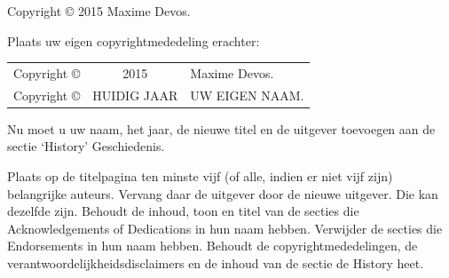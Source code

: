 \documentclass[11pt,a5paper,twoside]{book}
\begin{document}
   Copyright © 2015 Maxime Devos.


  Plaats uw eigen copyrightmededeling erachter:

  \begin{longtabu}{c c l}
   Copyright ©&2015       &Maxime Devos.\\
   Copyright ©&HUIDIG JAAR&UW EIGEN NAAM.
  \end{longtabu}

  Nu moet u uw naam, het jaar, de nieuwe titel en de uitgever toevoegen
   aan de sectie ‘History’ Geschiedenis.

  Plaats op de titelpagina ten minste vijf (of alle, indien er niet vijf zijn)
   belangrijke auteurs. Vervang daar de uitgever door de nieuwe uitgever.
  Die kan dezelfde zijn.
  Behoudt de inhoud, toon en titel van de secties die Acknowledgements of
   Dedications in hun naam hebben.
  Verwijder de secties die Endorsements in hun naam hebben.
  Behoudt de copyrightmededelingen, de verantwoordelijkheidsdisclaimers
   en de inhoud van de sectie de History heet.
\end{document}
